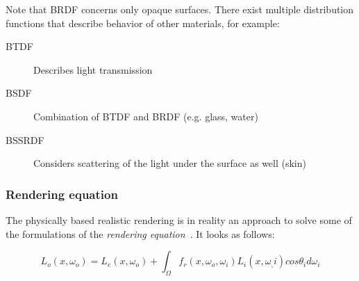 Note that BRDF concerns only opaque surfaces. There exist multiple distribution functions that describe behavior of other materials, for example:
\begin{description}
	\item[BTDF] Describes light transmission
	\item[BSDF] Combination of BTDF and BRDF (e.g. glass, water)
	\item[BSSRDF] Considers scattering of the light under the surface as well (skin)
\end{description}


\subsubsection{Rendering equation}

The physically based realistic rendering is in reality an approach to solve some of the formulations of the \emph{rendering equation}~\cite{kajiya1986rendering}. It looks as follows:

\begin{equation}
L_o(x,\omega_o)=L_e(x,\omega_o)+\int_{\Omega}f_r(x,\omega_o,\omega_i) L_i(x,\omega_,i) cos\theta_i d\omega_i
\end{equation}




